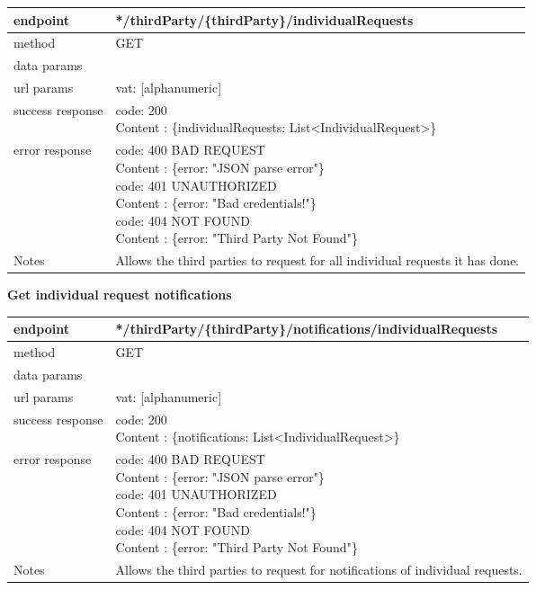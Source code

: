 	\begin{tabularx}{\linewidth}{| l| l }
		\hline
		endpoint & */thirdParty/\{thirdParty\}/individualRequests \\
		\hline
		method & GET \\
		\hline
		data params & \\
		\hline
		url params &
		\parbox{0.7\textwidth}{
			\bigskip
			vat: [alphanumeric]
			\bigskip
		} \\
		\hline
		success response &
		\parbox{0.7\textwidth}{
			\bigskip
			code: 200\\
			Content : \{individualRequests: List<IndividualRequest>\}
			\bigskip
		} \\
		\hline
		error response &
		\parbox{0.7\textwidth}{
			\bigskip
			code: 400 BAD REQUEST \\
			Content : \{error: "JSON parse error"\}\\
			code: 401 UNAUTHORIZED \\
			Content : \{error: "Bad credentials!"\}\\
			code: 404 NOT FOUND \\
			Content : \{error: "Third Party Not Found"\}
			\bigskip
		} \\
		\hline
		Notes & 
		\parbox{0.7\textwidth}{
			\bigskip Allows the third parties to request for all individual requests it has done.
		\bigskip}  \\
		\hline
	\end{tabularx}
	
	\textbf{Get individual request notifications} \\

	\begin{tabularx}{\linewidth}{| l| l }
		\hline
		endpoint & */thirdParty/\{thirdParty\}/notifications/individualRequests \\
		\hline
		method & GET \\
		\hline
		data params & \\
		\hline
		url params &
		\parbox{0.7\textwidth}{
			\bigskip
			vat: [alphanumeric]
			\bigskip
		} \\
		\hline
		success response &
		\parbox{0.7\textwidth}{
			\bigskip
			code: 200\\
			Content : \{notifications: List<IndividualRequest>\}
			\bigskip
		} \\
		\hline
		error response &
		\parbox{0.7\textwidth}{
			\bigskip
			code: 400 BAD REQUEST \\
			Content : \{error: "JSON parse error"\}\\
			code: 401 UNAUTHORIZED \\
			Content : \{error: "Bad credentials!"\}\\
			code: 404 NOT FOUND \\
			Content : \{error: "Third Party Not Found"\}
			\bigskip
		} \\
		\hline
		Notes & 
		\parbox{0.7\textwidth}{
			\bigskip Allows the third parties to request for notifications of individual requests.
		\bigskip}  \\
		\hline
	\end{tabularx}
	
